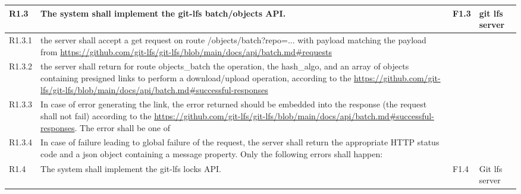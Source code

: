 \begin{landscape}
\begin{longtable}{|p{1cm}|p{19cm}|p{2cm}|p{3cm}|}
        \rowcolor[HTML]{DDFFDD}        R1.3       & The system shall implement the git-lfs batch/objects API.                                                                                                                                                                                                                             & F1.3                  & git lfs server                           \\ \hline
        \rowcolor[HTML]{EEFFEE}        R1.3.1     & the server shall accept a get request on route /objects/batch?repo=... with payload matching the payload from \url{https://github.com/git-lfs/git-lfs/blob/main/docs/api/batch.md#requests}                                                                                           &                       &                                          \\\hline
        \rowcolor[HTML]{EEFFEE}        R1.3.2     & the server shall return for route objects\_batch the operation, the hash\_algo, and an array of objects containing presigned links to perform a download/upload operation, according to the \url{https://github.com/git-lfs/git-lfs/blob/main/docs/api/batch.md#successful-responses} &                       &                                          \\\hline
        \rowcolor[HTML]{EEFFEE}        R1.3.3     & In case of error generating the link, the error returned should be embedded into the response (the request shall not fail) according to the \url{https://github.com/git-lfs/git-lfs/blob/main/docs/api/batch.md#successful-responses}. The error shall be one of                      &                       &                                          \\\hline
        \rowcolor[HTML]{EEFFEE}        R1.3.4     & In case of failure leading to global failure of the request, the server shall return the appropriate HTTP status code and a json object containing a message property. Only the following errors shall happen:                                                                        &                       &                                          \\\hline
        \rowcolor[HTML]{FFDDDD}        R1.4       & The system shall implement the git-lfs locks API.                                                                                                                                                                                                                                     & F1.4                  & Git lfs server                           \\ \hline

\end{longtable}
\end{landscape}

